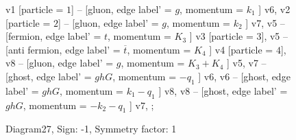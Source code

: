 \documentclass{revtex4}
\begin{document}
\begin{figure}[!htb]
\begin{center}
{    %
v1 [particle = \(1\)] -- [gluon, edge label' = \(g\), momentum = \(k_{1}\) ] v6, 
v2 [particle = \(2\)] -- [gluon, edge label' = \(g\), momentum = \(k_{2}\) ] v7, 
v5 -- [fermion, edge label' = \(t\), momentum = \(K_{3}\) ] v3 [particle = \(3\)], 
v5 -- [anti fermion, edge label' = \(\overline{t}\), momentum = \(K_{4}\) ] v4 [particle = \(4\)], 
v8 -- [gluon, edge label' = \(g\), momentum = \(K_{3} + K_{4}\) ] v5, 
v7 -- [ghost, edge label' = \(ghG\), momentum = \(-q_{1}\) ] v6, 
v6 -- [ghost, edge label' = \(ghG\), momentum = \(k_{1} - q_{1}\) ] v8, 
v8 -- [ghost, edge label' = \(ghG\), momentum = \(-k_{2} - q_{1}\) ] v7, 
};
\end{center}
\caption{Diagram27, Sign: -1, Symmetry factor: 1}
\end{figure}
\newpage
\end{document}
